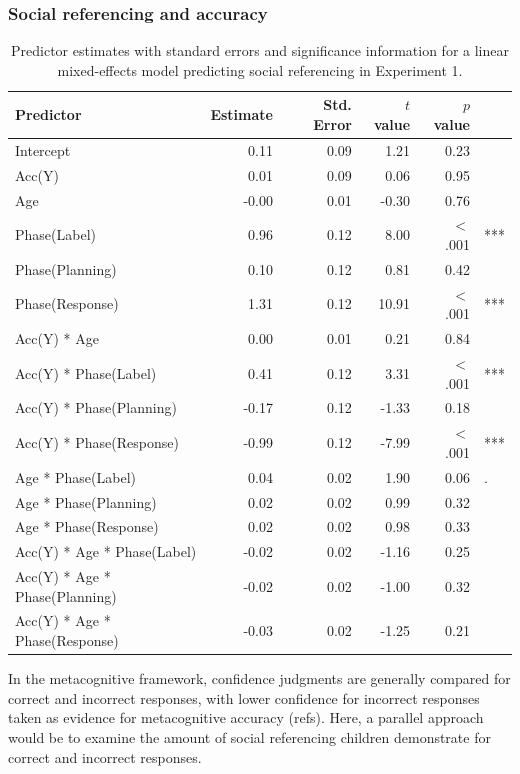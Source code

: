 \documentclass[a4paper,man,apacite,floatsintext]{apa6}
\begin{document}
\subsubsection{Social referencing and
accuracy}\label{social-referencing-and-accuracy}

\begin{table}[tb]
\centering
\begin{tabular}{lrrrrl}
 Predictor & Estimate & Std. Error & $t$ value & $p$ value &  \\ 
  \hline
Intercept & 0.11 & 0.09 & 1.21 & 0.23 &  \\ 
  Acc(Y) & 0.01 & 0.09 & 0.06 & 0.95 &  \\ 
  Age & -0.00 & 0.01 & -0.30 & 0.76 &  \\ 
  Phase(Label) & 0.96 & 0.12 & 8.00 & $<$ .001 & *** \\ 
  Phase(Planning) & 0.10 & 0.12 & 0.81 & 0.42 &  \\ 
  Phase(Response) & 1.31 & 0.12 & 10.91 & $<$ .001 & *** \\ 
  Acc(Y) * Age & 0.00 & 0.01 & 0.21 & 0.84 &  \\ 
  Acc(Y) * Phase(Label) & 0.41 & 0.12 & 3.31 & $<$ .001 & *** \\ 
  Acc(Y) * Phase(Planning) & -0.17 & 0.12 & -1.33 & 0.18 &  \\ 
  Acc(Y) * Phase(Response) & -0.99 & 0.12 & -7.99 & $<$ .001 & *** \\ 
  Age * Phase(Label) & 0.04 & 0.02 & 1.90 & 0.06 & . \\ 
  Age * Phase(Planning) & 0.02 & 0.02 & 0.99 & 0.32 &  \\ 
  Age * Phase(Response) & 0.02 & 0.02 & 0.98 & 0.33 &  \\ 
  Acc(Y) * Age * Phase(Label) & -0.02 & 0.02 & -1.16 & 0.25 &  \\ 
  Acc(Y) * Age * Phase(Planning) & -0.02 & 0.02 & -1.00 & 0.32 &  \\ 
  Acc(Y) * Age * Phase(Response) & -0.03 & 0.02 & -1.25 & 0.21 &  \\ 
   \hline
\end{tabular}
\caption{Predictor estimates with standard errors and significance information for a linear mixed-effects model predicting social referencing in Experiment 1.} 
\label{tab:exp2acc_reg}
\end{table}

In the metacognitive framework, confidence judgments are generally
compared for correct and incorrect responses, with lower confidence for
incorrect responses taken as evidence for metacognitive accuracy (refs).
Here, a parallel approach would be to examine the amount of social
referencing children demonstrate for correct and incorrect responses.
\end{document}
